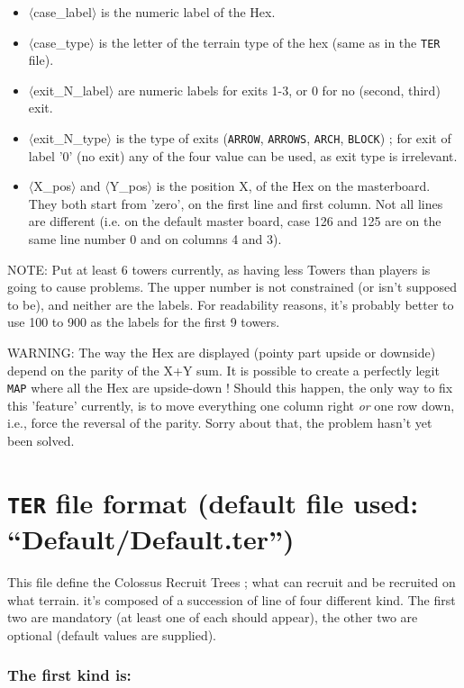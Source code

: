 \documentclass{article}
\begin{document}
\begin{itemize}
\item $\langle$case\_label$\rangle$ is the numeric label of the Hex.
\item $\langle$case\_type$\rangle$ is the letter of the terrain type of the hex (same as in the \texttt{TER} file).
\item $\langle$exit\_N\_label$\rangle$ are numeric labels for exits 1-3, or 0 for no (second, third) exit.
\item $\langle$exit\_N\_type$\rangle$ is the type of exits (\texttt{ARROW}, \texttt{ARROWS}, \texttt{ARCH}, \texttt{BLOCK}) ; for exit of label '0' (no exit) any of the four value can be used, as exit type is irrelevant.
\item $\langle$X\_pos$\rangle$ and $\langle$Y\_pos$\rangle$ is the position X, of the Hex on the masterboard. They both start from 'zero', on the first line and first column. Not all lines are different (i.e. on the default master board, case 126 and 125 are on the same line number 0 and on columns 4 and 3).
\end{itemize}

NOTE: Put at least 6 towers currently, as having less Towers than players is going to cause problems. The upper number is not constrained (or isn't supposed to be), and neither are the labels. For readability reasons, it's probably better to use 100 to 900 as the labels for the first 9 towers.

WARNING: The way the Hex are displayed (pointy part upside or downside) depend on the parity of the X+Y sum. It is possible to create a perfectly legit \texttt{MAP} where all the Hex are upside-down ! Should this happen, the only way to fix this 'feature' currently, is to move everything one column right \emph{or} one row down, i.e., force the reversal of the parity. Sorry about that, the problem hasn't yet been solved.

\section{\texttt{TER} file format (default file used: ``Default/Default.ter'')}
\label{TER}

This file define the Colossus Recruit Trees ; what can recruit and be recruited on what terrain. it's composed of a succession of line of four different kind.
The first two are mandatory (at least one of each should appear), the other two are optional (default values are supplied).

\subsubsection*{The first kind is:}
\end{document}
